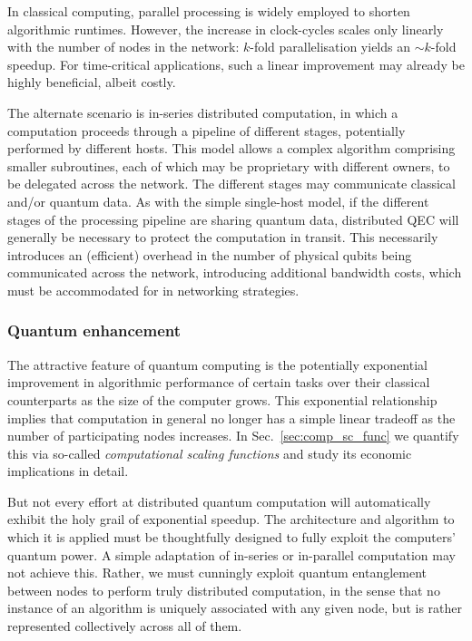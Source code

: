 In classical computing, parallel processing is widely employed to shorten algorithmic runtimes. However, the increase in clock-cycles scales only linearly with the number of nodes in the network: $k$-fold parallelisation yields an \mbox{$\sim k$}-fold speedup. For time-critical applications, such a linear improvement may already be highly beneficial, albeit costly.

The alternate scenario is in-series distributed computation, in which a computation proceeds through a pipeline of different stages, potentially performed by different hosts. This model allows a complex algorithm comprising smaller subroutines, each of which may be proprietary with different owners, to be delegated across the network. The different stages may communicate classical and/or quantum data. As with the simple single-host model, if the different stages of the processing pipeline are sharing quantum data, distributed QEC will generally be necessary to protect the computation in transit. This necessarily introduces an (efficient) overhead in the number of physical qubits being communicated across the network, introducing additional bandwidth costs, which must be accommodated for in networking strategies.

\subsubsection{Quantum enhancement}

The attractive feature of quantum computing is the potentially exponential improvement in algorithmic performance of certain tasks over their classical counterparts as the size of the computer grows. This exponential relationship implies that computation in general no longer has a simple linear tradeoff as the number of participating nodes increases. In Sec.~\ref{sec:comp_sc_func} we quantify this via so-called \textit{computational scaling functions} and study its economic implications in detail.

But not every effort at distributed quantum computation will automatically exhibit the holy grail of exponential speedup. The architecture and algorithm to which it is applied must be thoughtfully designed to fully exploit the computers' quantum power. A simple adaptation of in-series or in-parallel computation may not achieve this. Rather, we must cunningly exploit quantum entanglement between nodes to perform truly distributed computation, in the sense that no instance of an algorithm is uniquely associated with any given node, but is rather represented collectively across all of them.

